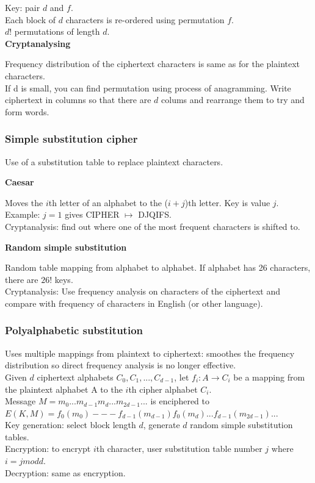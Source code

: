 \documentclass{article}
\begin{document}
Key: pair $d$ and $f$.\\
Each block of $d$ characters is re-ordered using permutation $f$.\\
$d!$ permutations of length $d$.\\

\textbf{Cryptanalysing}

Frequency distribution of the ciphertext characters is same as for the plaintext characters.\\
If d is small, you can find permutation using process of anagramming. Write ciphertext in columns so that there are $d$ colums and rearrange them to try and form words.

\subsubsection{Simple substitution cipher}

Use of a substitution table to replace plaintext characters.

\textbf{Caesar}

Moves the $i$th letter of an alphabet to the ($i+j$)th letter. Key is value $j$.\\
Example: $j=1$ gives CIPHER $\mapsto$ DJQIFS.\\
Cryptanalysis: find out where one of the most frequent characters is shifted to. 

\textbf{Random simple substitution}

Random table mapping from alphabet to alphabet. If alphabet has 26 characters, there are $26!$ keys.\\
Cryptanalysis: Use frequency analysis on characters of the ciphertext and compare with frequency of characters in English (or other language).

\subsubsection{Polyalphabetic substitution}

Uses multiple mappings from plaintext to ciphertext: smoothes the frequency distribution so direct frequency analysis is no longer effective.\\
Given $d$ ciphertext alphabets $C_0, C_1, ..., C_{d-1}$, let $f_i: A \rightarrow C_i$ be a mapping from the plaintext alphabet A to the $i$th cipher alphabet $C_i$.\\
Message $M = m_0 ... m_{d-1} m_d ... m_{2d-1} ...$ is enciphered to $E(K,M) = f_0 (m_0) --- f_{d-1} (m_{d-1}) f_0(m_d) ... f_{d-1} (m_{2d-1}) ...$\\
Key generation: select block length $d$, generate $d$ random simple substitution tables.\\
Encryption: to encrypt $i$th character, user substitution table number $j$ where $i = j mod d$.\\
Decryption: same as encryption.
\end{document}

